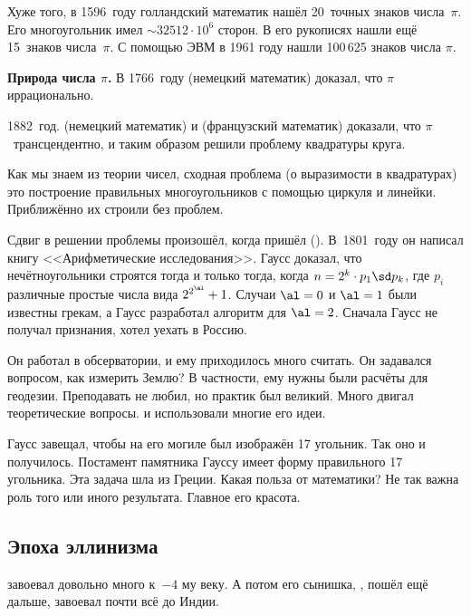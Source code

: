 \documentclass[a4paper,oneside,fleqn,10pt]{article}
\begin{document}
Хуже того, в 1596~году голландский математик  нашёл 20~точных знаков числа~$\pi$.
Его многоугольник имел $\sim32512\cdot 10^6$ сторон. В его рукописях нашли ещё 15~знаков числа~$\pi$.
С помощью ЭВМ в 1961 году нашли 100\,625 знаков числа $\pi$.

\textbf{Природа числа $\pi$.}
В 1766~году  (немецкий математик) доказал, что $\pi$ иррационально.

1882~год.  (немецкий математик) и 
(французский математик) доказали, что $\pi$~трансцендентно,
и таким образом решили проблему квадратуры круга.

Как мы знаем из теории чисел, сходная проблема (о выразимости в квадратурах) это построение
правильных многоугольников с помощью циркуля и линейки.
Приближённо их строили без проблем.

Сдвиг в решении проблемы произошёл, когда пришёл  ().
В~1801~году он написал книгу <<Арифметические исследования>>.
Гаусс доказал, что нечётноугольники строятся тогда и только тогда, когда
$n = 2^k \cdot p_1 \sd p_k$, где $p_i$ различные простые числа вида $2^{2^\al} +1$.
Случаи $\al = 0$ и $\al = 1$ были известны грекам,
а Гаусс разработал алгоритм для $\al = 2$.
Сначала Гаусс не получал признания, хотел уехать в Россию.

Он работал в обсерватории, и ему приходилось много считать. Он задавался вопросом, как измерить Землю?
В частности, ему нужны были расчёты для геодезии. Преподавать не любил, но практик был великий.
Много двигал теоретические вопросы.  и  использовали многие его идеи.

Гаусс завещал, чтобы на его могиле был изображён 17 угольник.
Так оно и получилось. Постамент памятника Гауссу  имеет
форму правильного 17 угольника.
Эта  задача шла из Греции. Какая польза от математики?
Не так важна роль того или иного результата. Главное его красота.


\subsection{Эпоха эллинизма}

 завоевал довольно много к~$-4$ му веку. А потом
его сынишка, , пошёл ещё дальше, завоевал почти всё до Индии.
\end{document}
